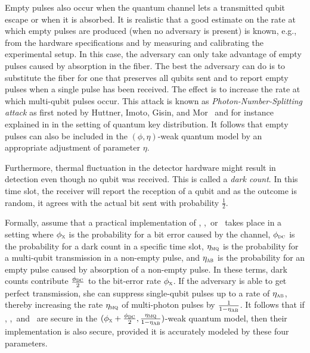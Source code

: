 Empty pulses also occur when the quantum channel lets a transmitted
qubit escape or when it is absorbed. It is realistic that a good
estimate on the rate at which empty pulses are produced (when no
adversary is present) is known, e.g., from the hardware specifications
and by measuring and calibrating the experimental setup. In this case,
the adversary can only take advantage of empty pulses caused by
absorption in the fiber. The best the adversary can do is to
substitute the fiber for one that preserves all qubits sent and to
report empty pulses when a single pulse has been received. The effect
is to increase the rate at which multi-qubit pulses occur. This attack
is known as \emph{Photon-Number-Splitting attack} as first noted by
Huttner, Imoto, Gisin, and Mor~\cite{HIGM95} and for instance
explained in \cite{BLMS00a,BLMS00b} in the setting of quantum key
distribution. It follows that empty pulses can also be included in the
$(\phi,\eta)$-weak quantum model by an appropriate adjustment of
parameter $\eta$.

Furthermore, thermal fluctuation in the detector hardware might result
in detection even though no qubit was received. This is called a
\emph{dark count}. In this time slot, the receiver will report the
reception of a qubit and as the outcome is random, it agrees with the
actual bit sent with probability $\frac12$.


Formally, assume that a practical implementation of \BBqot,
\Randlqot,\ or \comm\ takes place in a setting where $\phi_{\mbox{\scriptsize{\sc x}}}$ is the
probability for a bit error caused by the channel, $\phi_{\mbox{\scriptsize{\sc dc}}}$ is the
probability for a dark count in a specific time slot, $\eta_{\mbox{\scriptsize{\sc mq}}}$ is the
probability for a multi-qubit transmission in a non-empty pulse, and
$\eta_{\mbox{\scriptsize{\sc ab}}}$ is the probability for an empty
pulse caused by absorption of a non-empty pulse. %
In these terms, dark counts contribute $\frac{\phi_{\mbox{\scriptsize{\sc dc}}}}{2}$ to the
bit-error rate $\phi_{\mbox{\scriptsize{\sc x}}}$. If the adversary is able to get perfect
transmission, she can suppress single-qubit pulses up to a rate of
$\eta_{\mbox{\scriptsize{\sc ab}}}$, thereby increasing the rate $\eta_{\mbox{\scriptsize{\sc mq}}}$ of multi-photon pulses
by $\frac{1}{1-\eta_{\mbox{\scriptsize{\sc ab}}}}$.  It follows that if \BBqot, \comm,\ and
\Randlqot\ 
are secure in the $(\phi_{\mbox{\scriptsize{\sc x}}}+\frac{\phi_{\mbox{\scriptsize{\sc dc}}}}{2},
\frac{\eta_{\mbox{\scriptsize{\sc mq}}}}{1-\eta_{\mbox{\scriptsize{\sc ab}}}})$-weak quantum model, then their
implementation is also secure, provided it is accurately modeled by
these four parameters.  \index{weak quantum model}
 


